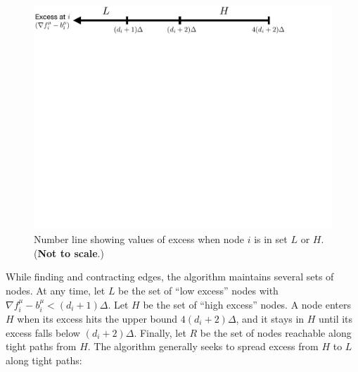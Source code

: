 \documentclass[11pt]{article}
\theoremstyle{definition}
\theoremstyle{definition}
\theoremstyle{definition}
\newcommand{\fu}{f^{\mu}}
\newcommand{\nfiu}{\nabla \fu_i}
\newcommand{\biu}{b_{i}^{\mu}}
\begin{document}
\begin{figure}[h!]
\centering
\includegraphics[width=\textwidth]{figs/lh.pdf}
\caption{
\label{fig:lh}
Number line showing values of excess when node $i$ is in set $L$ or $H$.
(\textbf{Not to scale}.)
}
\end{figure}
While finding and contracting edges, the algorithm maintains several sets of nodes.
At any time, let $L$ be the set of ``low excess'' nodes with $\nfiu - \biu < (d_i +1)\Delta$.
Let $H$ be the set of ``high excess'' nodes. A node enters $H$ when its excess hits the upper bound
$4(d_i + 2)\Delta$, and it stays in $H$ until its excess falls below $(d_i + 2)\Delta$. Finally,
let $R$ be the set of nodes reachable along tight paths from $H$. The algorithm generally
seeks to spread excess from $H$ to $L$ along tight paths:
\end{document}
